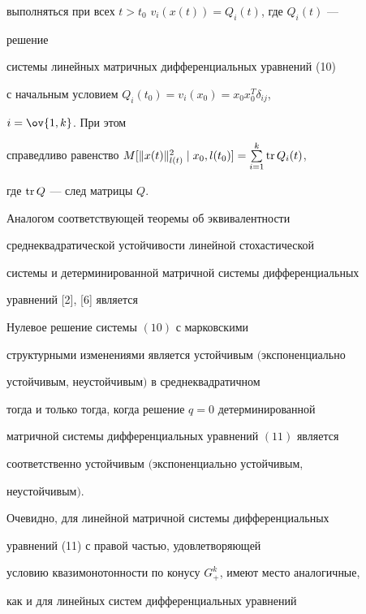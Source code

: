 выполняться при всех $t>t_0$\; $v_i(x(t))=Q_i(t)$, где $Q_i(t)$ --- 


решение 


системы линейных матричных дифференциальных уравнений (10)  


с начальным условием $Q_i(t_0)=v_i(x_0)=x_0x^T_0\delta_{ij}$, 


$i=\ov{1,k}$. При этом 


справедливо равенство $M[\|x(t)\|^2_{l(t)}\mid 


x_0,l(t_0)]=\sum\limits^k_{i=1}\tr Q_i(t)$, 


где $\operatorname{tr} Q$ --- след матрицы $Q$. 


\medskip 


 


Аналогом соответствующей теоремы об эквивалентности  


среднеквадратической устойчивости линейной стохастической  


системы и детерминированной матричной системы дифференциальных 


уравнений [2], [6] является 


 


\begin{thm} 


Нулевое решение системы $(10)$ с марковскими 


структурными изменениями является устойчивым $($экспоненциально 


устойчивым, неустойчивым$)$ в среднеквадратичном 


тогда и только тогда, когда решение $q=0$ детерминированной 


матричной системы дифференциальных уравнений $(11)$ является 


соответственно устойчивым $($экспоненциально устойчивым,  


неустойчивым$)$. 


\end{thm} 


 


Очевидно, для линейной матричной системы дифференциальных 


уравнений (11) с правой частью, удовлетворяющей 


условию квазимонотонности по конусу $G^k_+$, имеют место аналогичные, 


как и для линейных систем дифференциальных уравнений  


